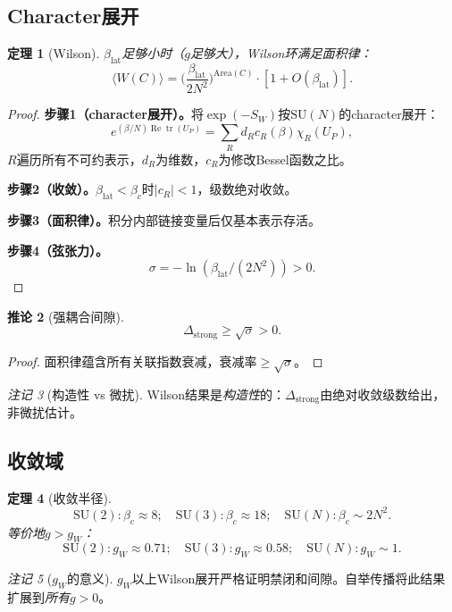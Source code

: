 \documentclass[12pt,a4paper]{article}
\theoremstyle{plain}
\newtheorem{theorem}{定理}[section]\newtheorem{lemma}[theorem]{引理}\newtheorem{corollary}[theorem]{推论}\newtheorem{proposition}[theorem]{命题}
\theoremstyle{definition}\newtheorem{definition}[theorem]{定义}
\theoremstyle{remark}\newtheorem{remark}[theorem]{注记}
\begin{document}
\subsection{Character展开}\label{sec:character}
\begin{theorem}[Wilson\cite{Wilson1974}]\label{thm:wilson}
$\beta_{\mathrm{lat}}$足够小时（$g$足够大），Wilson环满足面积律：
\begin{equation}\label{eq:arealaw}
\langle W(C)\rangle = \Big(\frac{\beta_{\mathrm{lat}}}{2N^2}\Big)^{\!\mathrm{Area}(C)}\!\cdot[1+O(\beta_{\mathrm{lat}})].
\end{equation}
\end{theorem}
\begin{proof}
\textbf{步骤1（character展开）。}将$\exp(-S_W)$按$\mathrm{SU}(N)$的character展开：
\begin{equation}\label{eq:charexp}
e^{(\beta/N)\operatorname{Re}\operatorname{tr}(U_P)}=\sum_R d_R c_R(\beta)\chi_R(U_P),
\end{equation}
$R$遍历所有不可约表示，$d_R$为维数，$c_R$为修改Bessel函数之比。

\textbf{步骤2（收敛）。}$\beta_{\mathrm{lat}}<\beta_c$时$|c_R|<1$，级数绝对收敛。

\textbf{步骤3（面积律）。}积分内部链接变量后仅基本表示存活。

\textbf{步骤4（弦张力）。}
\begin{equation}\label{eq:sigma}
\sigma=-\ln(\beta_{\mathrm{lat}}/(2N^2))>0.
\end{equation}
\end{proof}
\begin{corollary}[强耦合间隙]\label{cor:stronggap}
\begin{equation}\label{eq:stronggap}
\Delta_{\mathrm{strong}}\geq\sqrt{\sigma}>0.
\end{equation}
\end{corollary}
\begin{proof}
面积律蕴含所有关联指数衰减，衰减率$\geq\sqrt{\sigma}$。
\end{proof}
\begin{remark}[构造性 vs 微扰]
Wilson结果是\emph{构造性}的：$\Delta_{\mathrm{strong}}$由绝对收敛级数给出，非微扰估计。
\end{remark}
\subsection{收敛域}\label{sec:domain}
\begin{theorem}[收敛半径]\label{thm:radius}
\begin{equation}\label{eq:betac}
\mathrm{SU}(2):\beta_c\approx 8;\quad\mathrm{SU}(3):\beta_c\approx 18;\quad\mathrm{SU}(N):\beta_c\sim 2N^2.
\end{equation}
等价地$g>g_W$：
\begin{equation}\label{eq:gW}
\mathrm{SU}(2):g_W\approx 0.71;\quad\mathrm{SU}(3):g_W\approx 0.58;\quad\mathrm{SU}(N):g_W\sim 1.
\end{equation}
\end{theorem}
\begin{remark}[$g_W$的意义]
$g_W$以上Wilson展开严格证明禁闭和间隙。自举传播将此结果扩展到\emph{所有}$g>0$。
\end{remark}
\end{document}
